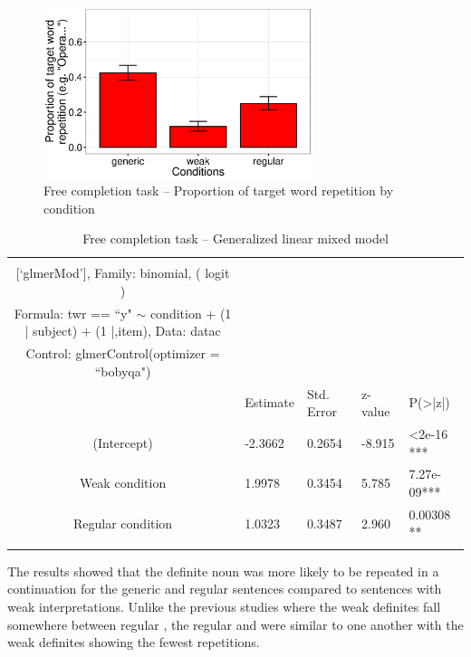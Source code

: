 \documentclass[output=paper,
modfonts
]{langscibook}
\begin{document}
\begin{figure}[p]
\centering
\includegraphics[width=0.7\textwidth]{figures/graf_compprop}
\caption{Free completion task -- Proportion of target word repetition by condition}
\label{fig:desaetal:9}
\end{figure}


\begin{table}[p]
\centering
\caption{Free completion task -- Generalized linear mixed model}
\label{tab:desaetal:7}
\begin{tabularx}{\textwidth}{cXXXX}
\lsptoprule
\multicolumn{5}{c}{
\begin{tabular}[c]{@{}c@{}}{\small Generalized linear mixed model fit by maximum likelihood (Laplace Approximation)}\\ {[}`glmerMod'{]}, Family: binomial, ( logit )\\ Formula: twr == ``y" $\sim$ condition + (1 | subject) + (1 |,item), Data: datac\\ Control: glmerControl(optimizer = ``bobyqa")\end{tabular}} \\ \midrule
 & {Estimate} & {Std. Error} & {z-value} & {P(\textgreater|z|)} \\ 
 \midrule
(Intercept) & -2.3662 & 0.2654 & -8.915 & \textless 2e-16 *** \\ 
Weak condition & 1.9978 & 0.3454 & 5.785 & 7.27e-09*** \\ 
Regular condition & 1.0323 & 0.3487 & 2.960 & 0.00308 ** \\ 
\lspbottomrule
\end{tabularx}
\end{table} 

The results showed that the definite noun was more likely to be repeated in a continuation for the generic and regular sentences compared to sentences with weak interpretations.  Unlike the previous studies where the weak definites fall somewhere between regular , the regular and  were similar to one another with the weak definites showing the fewest repetitions. 
\end{document}
